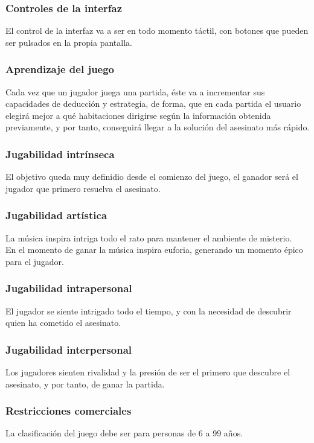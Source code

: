 \subsubsection{Controles de la interfaz}
El control de la interfaz va a ser en todo momento táctil, con botones que pueden ser pulsados en la propia pantalla.

\subsubsection{Aprendizaje del juego}
Cada vez que un jugador juega una partida, éste va a incrementar sus capacidades de deducción y estrategia, de forma, que en cada partida el usuario elegirá mejor a qué habitaciones dirigirse según la información obtenida previamente, y por tanto, conseguirá llegar a la solución del asesinato más rápido.

\subsubsection{Jugabilidad intrínseca}
El objetivo queda muy definidio desde el comienzo del juego, el ganador será el jugador que primero resuelva el asesinato.

\subsubsection{Jugabilidad artística}
La música inspira intriga todo el rato para mantener el ambiente de misterio.\\

En el momento de ganar la música inspira euforia, generando un momento épico para el jugador.

\subsubsection{Jugabilidad intrapersonal}
El jugador se siente intrigado todo el tiempo, y con la necesidad de descubrir quien ha cometido el asesinato.

\subsubsection{Jugabilidad interpersonal}
Los jugadores sienten rivalidad y la presión de ser el primero que descubre el asesinato, y por tanto, de ganar la partida.

\subsubsection{Restricciones comerciales}
La clasificación del juego debe ser para personas de 6 a 99 años.

